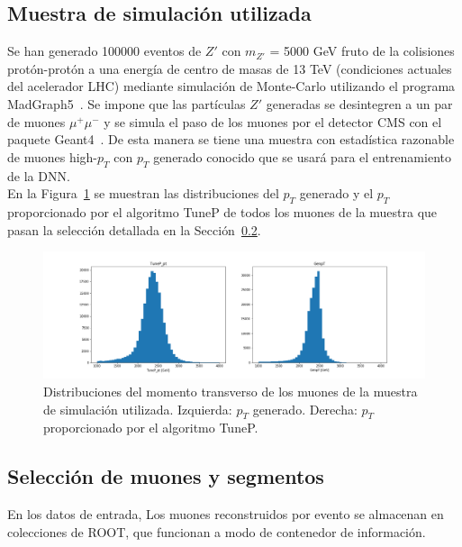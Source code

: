 \subsection{Muestra de simulaci\'on utilizada}\label{sec:sample}

Se han generado 100000 eventos de $Z'$ con $m_{Z'}$ = 5000 GeV fruto de la colisiones prot\'on-prot\'on a una energ\'ia de centro de masas de 13 TeV (condiciones actuales del acelerador LHC) mediante simulaci\'on de Monte-Carlo utilizando el programa MadGraph5~\cite{Alwall:2014hca}. Se impone que las part\'iculas $Z'$ generadas se desintegren a un par de muones $\mu^{+}\mu^{-}$ y se simula el paso de los muones por el detector CMS con el paquete Geant4~\cite{Agostinelli:2002hh}. De esta manera se tiene una muestra con estad\'istica razonable de muones high-$p_{T}$ con $p_{T}$ generado conocido que se usar\'a para el entrenamiento de la DNN. \\

En la Figura~\ref{fig:data_pt} se muestran las distribuciones del $p_{T}$ generado y el $p_{T}$ proporcionado por el algoritmo TuneP de todos los muones de la muestra que pasan la selecci\'on detallada en la Secci\'on~\ref{sec:selection}.

\begin{figure}[h]
\centering
\includegraphics[width=1.0\textwidth]{figures/data_pt.png}
\caption{Distribuciones del momento transverso de los muones de la muestra de simulaci\'on utilizada. Izquierda: $p_{T}$ generado. Derecha: $p_{T}$ proporcionado por el algoritmo TuneP.}
\label{fig:data_pt}        
\end{figure}


\subsection{Selecci\'on de muones y segmentos}\label{sec:selection}

En los datos de entrada, Los muones reconstruidos por evento se almacenan en colecciones de ROOT, que funcionan a modo de contenedor de informaci\'on. 


